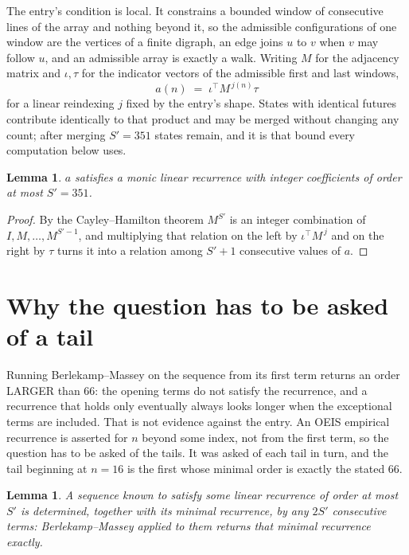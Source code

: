 \documentclass[11pt,a4paper]{article}
\theoremstyle{plain}
\newtheorem{lemma}[theorem]{Lemma}
\theoremstyle{definition}
\begin{document}
The entry's condition is local. It constrains a bounded window of consecutive lines of the
array and nothing beyond it, so the admissible configurations of one window are the vertices of
a finite digraph, an edge joins $u$ to $v$ when $v$ may follow $u$, and an admissible array is
exactly a walk. Writing $M$ for the adjacency matrix and $\iota,\tau$ for the indicator vectors
of the admissible first and last windows,
\[
a(n)\;=\;\iota^{\!\top}M^{\,j(n)}\tau
\]
for a linear reindexing $j$ fixed by the entry's shape. States with identical futures
contribute identically to that product and may be merged without changing any count; after
merging $S'=351$ states remain, and it is that bound every computation below uses.

\begin{lemma}\label{lem:cf}
$a$ satisfies a monic linear recurrence with integer coefficients of order at most $S'=351$.
\end{lemma}

\begin{proof}
By the Cayley--Hamilton theorem $M^{S'}$ is an integer combination of $I,M,\dots,M^{S'-1}$,
and multiplying that relation on the left by $\iota^{\!\top}M^{\,j}$ and on the right by
$\tau$ turns it into a relation among $S'+1$ consecutive values of $a$.
\end{proof}

\section{Why the question has to be asked of a tail}

Running Berlekamp--Massey on the sequence from its first term returns an order LARGER than $66$: the opening terms do not satisfy the recurrence, and a recurrence that holds only eventually always looks longer when the exceptional terms are included. That is not evidence against the entry. An OEIS empirical recurrence is asserted for $n$ beyond some index, not from the first term, so the question has to be asked of the tails. It was asked of each tail in turn, and the tail beginning at $n=16$ is the first whose minimal order is exactly the stated $66$.

\begin{lemma}\label{lem:bm}
A sequence known to satisfy some linear recurrence of order at most $S'$ is determined,
together with its minimal recurrence, by any $2S'$ consecutive terms: Berlekamp--Massey applied
to them returns that minimal recurrence exactly.
\end{lemma}
\end{document}
